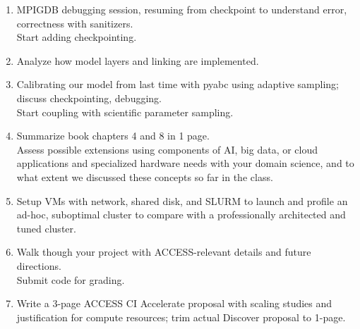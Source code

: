 \documentclass{article}
\begin{document}
\begin{tcbposter}
{\begin{multicols}{2}
\begin{enumerate}
        Peer pairing.\\
        \textcolor{blue!80!black}{\faWrench{}}
        Document, package with Spack or Apptainer.%
      \item \textcolor{blue!80!black}{\faKeyboardO{}}
        MPIGDB debugging session, resuming from
        checkpoint
        to understand error, correctness with sanitizers.\@\\
        \textcolor{blue!80!black}{\faWrench{}}
        Start adding checkpointing.%
      \item \textcolor{green!50!black}{\faKeyboardO{}}
        Analyze how model layers and linking are
        implemented\supercite{cilfone_2015}.%
      \item \textcolor{green!50!black}{\faKeyboardO{}}
        Calibrating our model from last time with
        pyabc using adaptive sampling; discuss
        checkpointing, debugging.\\
        \textcolor{green!50!black}{\faWrench{}}
        Start coupling with scientific parameter sampling.%
      \item \textcolor{green!50!black}{\faSuitcase{}}
        Summarize book\supercite{zbakh_2024} chapters 4
        and 8 in 1 page.\\
        \textcolor{green!50!black}{\faWrench{}}
        Assess possible extensions using components of AI, big data, or
        cloud applications and specialized hardware needs with your
        domain science, and to what extent we discussed these concepts
        so far in the class.%
      \item \textcolor{black!60}{\faKeyboardO{}}
        Setup VMs with network, shared disk, and
        SLURM to launch and profile an ad-hoc, suboptimal cluster
        to compare with a professionally architected and tuned cluster.%
      \item \textcolor{red!80!black}{\faKeyboardO{}}
        Walk though your project with
        ACCESS-relevant details and future directions.\\
        \textcolor{red!80!black}{\faWrench{}} Submit code for grading.%
      \item \textcolor{red!80!black}{\faWrench{}}
        Write a 3-page ACCESS CI
        Accelerate proposal with scaling studies and justification for
        compute resources; trim actual Discover proposal to
        1-page.%
      \end{enumerate}
    \end{multicols}
  }


\end{tcbposter}
\end{document}

